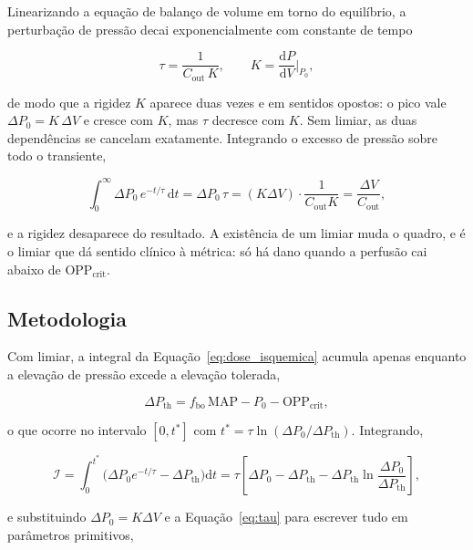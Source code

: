 Linearizando a equação de balanço de volume em torno do equilíbrio, a perturbação de pressão decai exponencialmente com constante de tempo

\begin{equation}
\tau=\frac{1}{C_{\mathrm{out}}\,K},
\qquad K=\frac{\mathrm{d}P}{\mathrm{d}V}\bigg|_{P_0},
\label{eq:tau}
\end{equation}

de modo que a rigidez $K$ aparece duas vezes e em sentidos opostos: o pico vale $\Delta P_0=K\,\Delta V$ e cresce com $K$, mas $\tau$ decresce com $K$. Sem limiar, as duas dependências se cancelam exatamente. Integrando o excesso de pressão sobre todo o transiente,

\begin{equation}
\int_{0}^{\infty}\Delta P_0\,e^{-t/\tau}\,\mathrm{d}t=\Delta P_0\,\tau=(K\Delta V)\cdot\frac{1}{C_{\mathrm{out}}K}=\frac{\Delta V}{C_{\mathrm{out}}},
\label{eq:sem_limiar}
\end{equation}

e a rigidez desaparece do resultado. A existência de um limiar muda o quadro, e é o limiar que dá sentido clínico à métrica: só há dano quando a perfusão cai abaixo de $\mathrm{OPP}_{\mathrm{crit}}$.

\subsection{Metodologia}

Com limiar, a integral da Equação~\ref{eq:dose_isquemica} acumula apenas enquanto a elevação de pressão excede a elevação tolerada,

\begin{equation}
\Delta P_{\mathrm{th}}=f_{\mathrm{bo}}\,\mathrm{MAP}-P_{0}-\mathrm{OPP}_{\mathrm{crit}},
\label{eq:dpth}
\end{equation}

o que ocorre no intervalo $[0,t^{\ast}]$ com $t^{\ast}=\tau\ln(\Delta P_0/\Delta P_{\mathrm{th}})$. Integrando,

\begin{equation}
\mathcal{I}=\int_{0}^{t^{\ast}}\!\big(\Delta P_0 e^{-t/\tau}-\Delta P_{\mathrm{th}}\big)\mathrm{d}t
=\tau\left[\Delta P_0-\Delta P_{\mathrm{th}}-\Delta P_{\mathrm{th}}\ln\frac{\Delta P_0}{\Delta P_{\mathrm{th}}}\right],
\label{eq:I_tau}
\end{equation}

e substituindo $\Delta P_0=K\Delta V$ e a Equação~\ref{eq:tau} para escrever tudo em parâmetros primitivos,

